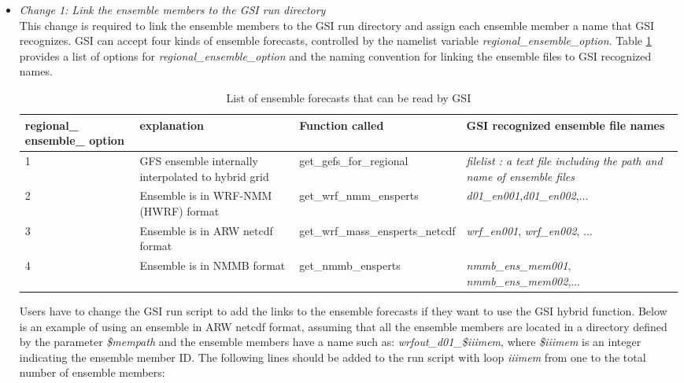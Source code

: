 \begin{itemize}[leftmargin=*]
\item \textit{Change 1: Link the ensemble members to the GSI run directory}\\

This change is required to link the ensemble members to the GSI run directory and assign each ensemble member a name that GSI recognizes. GSI can accept four kinds of ensemble forecasts, controlled by the namelist variable \textit{regional\_ensemble\_option}. Table \ref{tab51} provides a list of options for \textit{regional\_ensemble\_option} and the naming convention for linking the ensemble files to GSI recognized names. \\


\begin{table}[htbp]
\centering
\begin{small}
\caption{List of ensemble forecasts that can be read by GSI}
\begin{tabular}{|p{1.7cm}|p{4cm}|p{4.6cm}|p{4cm}|}
\hline
\hline
regional\_ ensemble\_ option & explanation & Function called & GSI recognized  ensemble file names \\
\hline
1 & GFS ensemble internally interpolated to hybrid grid & get\_gefs\_for\_regional & \textit{filelist : a text file including the path and name of ensemble files} \\
\hline
2 & Ensemble is in WRF-NMM (HWRF) format & get\_wrf\_nmm\_ensperts & 
\textit{d01\_en001},\newline \textit{d01\_en002},\newline ... \\
\hline
3 & Ensemble is in ARW netcdf format & get\_wrf\_mass\_ensperts\_netcdf & 
\textit{wrf\_en001}, \newline 
\textit{wrf\_en002}, \newline ... \\
\hline
4 & Ensemble is in NMMB format & get\_nmmb\_ensperts &
 \textit{nmmb\_ens\_mem001},\newline
  \textit{nmmb\_ens\_mem002},\newline ...\\
\hline
\end{tabular}
\label{tab51}
\end{small}
\end{table} 


Users have to change the GSI run script to add the links to the ensemble forecasts if they want to use the GSI hybrid function. Below is an example of using an ensemble in ARW netcdf format, assuming that all the ensemble members are located in a directory defined by the parameter \textit{\${mempath}} and the ensemble members have a name such as: \textit{wrfout\_d01\_\${iiimem}}, where \textit{\${iiimem}} is an integer indicating the ensemble member ID. The following lines should be added to the run script with loop \textit{iiimem} from one to the total number of ensemble members:


\end{itemize}

